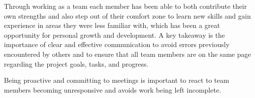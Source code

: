 \documentclass[conference,12pt]{IEEEtran}
\begin{document}
    Through working as a team each member has been able to both contribute their own strengths and also step out of their comfort zone to learn new skills and gain experience in areas they were less familiar with, which has been a great opportunity for personal growth and development.
    A key takeaway is the importance of clear and effective communication to avoid errors previously encountered by others and to ensure that all team members are on the same page regarding the project goals, tasks, and progress.

    Being proactive and committing to meetings is important to react to team members becoming unresponsive and avoids work being left incomplete.
    



\end{document}
